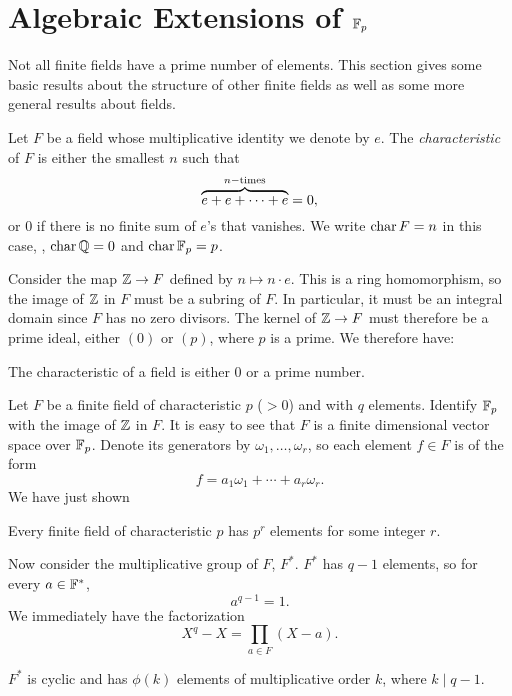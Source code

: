 \section{Algebraic Extensions of $\protect\mathbb{F}_p$}
\label{FF:AlgExt:Sec}

Not all finite fields have a prime number of elements.  This section
gives some basic results about the structure of other finite fields
as well as some more general results about fields.  

Let $F$ be a field whose multiplicative identity we denote by $e$.
The {\em characteristic} of $F$ is
either the smallest $n$ such that 
\[
\overbrace{e + e + \cdots + e}^{n-{\rm times}} = 0,
\]
or $0$ if there is no finite sum of $e$'s that vanishes.  We write
$\mathop{\rm char}\nolimits F = n$ in this case, \eg, $\mathop{\rm char}\nolimits \mathbb{Q} = 0$ and $\mathop{\rm char}\nolimits \mathbb{F}_p = p$.

Consider the map $\mathbb{Z}\rightarrow F$ defined by $n \mapsto n \cdot e$.
This is a ring homomorphism, so the image of $\mathbb{Z}$ in $F$ must be a
subring of $F$.  In particular, it must be an integral domain since
$F$ has no zero divisors.   The kernel of $\mathbb{Z} \rightarrow F$ must
therefore be a prime ideal, either $(0)$ or $(p)$, where $p$ is a
prime.  We therefore have:
\begin{proposition}
The characteristic of a field is either $0$ or a prime number.
\end{proposition}

Let $F$ be a finite field of characteristic $p$ ($> 0$) and with $q$
elements.  Identify $\mathbb{F}_p$ with the image of $\mathbb{Z}$ in $F$.  It is easy
to see that $F$ is a finite dimensional vector space over $\mathbb{F}_p$.
Denote its generators by $\omega_1, \ldots, \omega_r$, so each element
$f \in F$ is of the form
\[
f = a_1 \omega_1 + \cdots + a_r \omega_r.
\]
We have just shown
\begin{proposition}
Every finite field of characteristic $p$ has $p^r$ elements for some
integer $r$.
\end{proposition}

Now consider the multiplicative group of $F$, $F^{\ast}$.  $F^{\ast}$
has $q-1$ elements, so for every $a \in \mathbb{F}^{\ast}$, 
\[
a^{q-1} = 1.
\]
We immediately have the factorization
\[
X^q - X = \prod_{a \in F} (X - a).
\]

\begin{proposition} \label{FF:AlgExtOrder:Prop}
$F^{\ast}$ is cyclic and has $\phi(k)$ elements of multiplicative order
$k$, where $k\mid q-1$.
\end{proposition}

